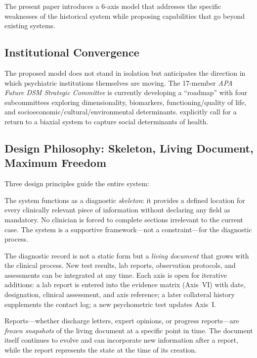 \documentclass[11pt,a4paper]{article}
\begin{document}
The present paper introduces a 6-axis model that addresses the specific weaknesses of the historical system while proposing capabilities that go beyond existing systems.

\subsection{Institutional Convergence}

The proposed model does not stand in isolation but anticipates the direction in which psychiatric institutions themselves are moving. The 17-member \textit{APA Future DSM Strategic Committee} is currently developing a ``roadmap'' with four subcommittees exploring dimensionality, biomarkers, functioning/quality of life, and socioeconomic/cultural/environmental determinants. \citet{ErlichFirst2025} explicitly call for a return to a biaxial system to capture social determinants of health.

\subsection{Design Philosophy: Skeleton, Living Document, Maximum Freedom}
\label{sec:designphilosophy}

Three design principles guide the entire system:

\begin{description}[style=nextline, leftmargin=1.5cm, font=\bfseries]
\item[Skeleton Principle] The system functions as a diagnostic \textit{skeleton}: it provides a defined location for every clinically relevant piece of information without declaring any field as mandatory. No clinician is forced to complete sections irrelevant to the current case. The system is a supportive framework---not a constraint---for the diagnostic process.
\item[Living Document] The diagnostic record is not a static form but a \textit{living document} that grows with the clinical process. New test results, lab reports, observation protocols, and assessments can be integrated at any time. Each axis is open for iterative additions: a lab report is entered into the evidence matrix (Axis~VI) with date, designation, clinical assessment, and axis reference; a later collateral history supplements the contact log; a new psychometric test updates Axis~I.
\item[Report as Snapshot] Reports---whether discharge letters, expert opinions, or progress reports---are \textit{frozen snapshots} of the living document at a specific point in time. The document itself continues to evolve and can incorporate new information after a report, while the report represents the state at the time of its creation.
\end{description}
\end{document}
